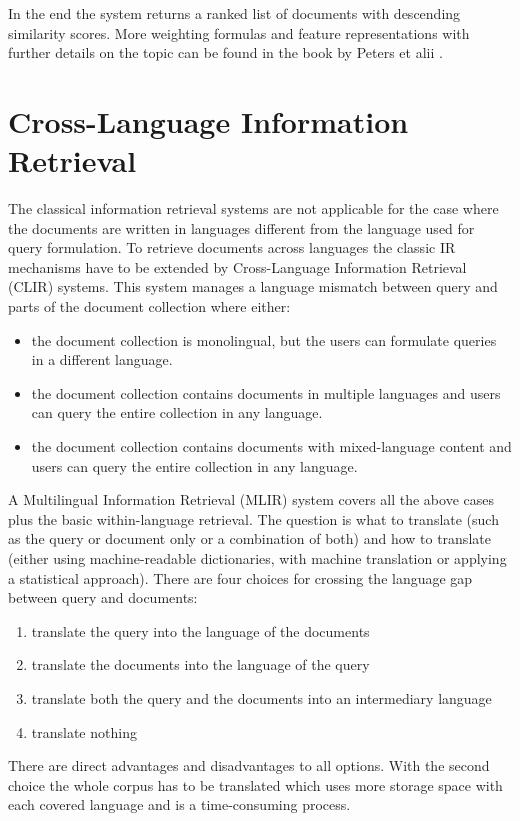 \documentclass[journal]{IEEEtran}
\begin{document}
In the end the system returns a ranked list of documents with descending similarity scores.
More weighting formulas and feature representations with further details on the topic can be found in the book by Peters et alii \cite{peters12}.



\section{Cross-Language Information Retrieval}
\label{sec:clir}
The classical information retrieval systems are not applicable for the case where the documents are written in languages different from the language used for query formulation.
To retrieve documents across languages the classic IR mechanisms have to be extended by Cross-Language Information Retrieval (CLIR) systems.
This system manages a language mismatch between query and parts of the document collection where either:
\begin{itemize}
	\item the document collection is monolingual, but the users can formulate queries in a different language.
	\item the document collection contains documents in multiple languages and users can query the entire collection in any language.
	\item the document collection contains documents with mixed-language content and users can query the entire collection in any language.
\end{itemize}
A Multilingual Information Retrieval (MLIR) system covers all the above cases plus the basic within-language retrieval.
The question is what to translate (such as the query or document only or a combination of both) and how to translate (either using machine-readable dictionaries, with machine translation or applying a statistical approach).
There are four choices for crossing the language gap between query and documents:
\begin{enumerate}
	\item translate the query into the language of the documents
	\item translate the documents into the language of the query
	\item translate both the query and the documents into an intermediary language
	\item translate nothing
\end{enumerate}
There are direct advantages and disadvantages to all options.
With the second choice the whole corpus has to be translated which uses more storage space with each covered language and is a time-consuming process.
\end{document}
